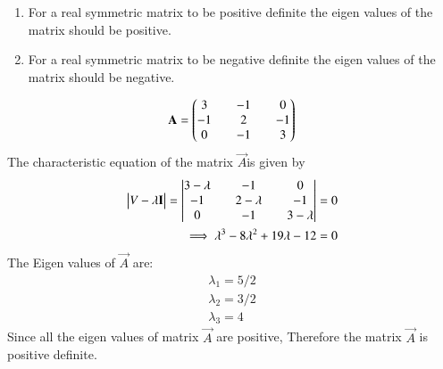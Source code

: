 \begin{enumerate}
\item For a real symmetric matrix to be positive definite the eigen values of the matrix should be positive.
\item For a real symmetric matrix to be negative definite the eigen values of the matrix should be negative.
\end{enumerate}
\begin{align*}
\mathbf{A} = \begin{pmatrix}3 && -1 && 0 \\ -1 && 2 && -1\\ 0 && -1 && 3\end{pmatrix}
\end{align*}
The characteristic equation of the matrix $\vec{A}$is given by
\begin{equation} \label{eq:solutions/2016/dec/22/eq:2.0.1}
\begin{split}
\begin{vmatrix}V-\lambda \mathbf{I}\end{vmatrix}=\begin{vmatrix}3-\lambda && -1 && 0\\ -1 && 2-\lambda && -1\\ 0 && -1 && 3-\lambda\end{vmatrix} = 0\\
\implies \lambda^3 - 8\lambda^2 + 19\lambda - 12 = 0
\end{split}
\end{equation}
The Eigen values of $\vec{A}$ are:
\begin{equation}
\begin{split}
\lambda_1 = 5/2\\
\lambda_2 = 3/2 \\
 \lambda_3 = 4
\end{split}
\end{equation}
Since all the eigen values of matrix $\vec{A}$ are positive, Therefore the matrix $\vec{A}$ is positive definite.
